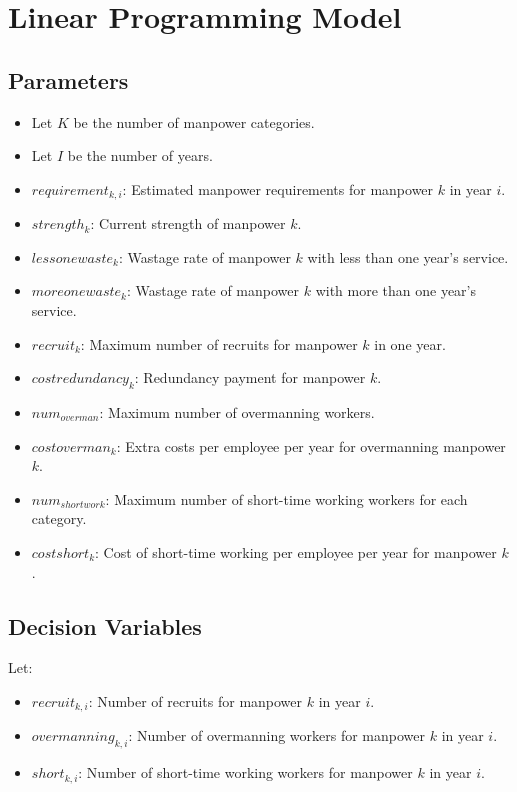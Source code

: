 \documentclass{article}
\begin{document}
\section*{Linear Programming Model}

\subsection*{Parameters}
\begin{itemize}
    \item Let $K$ be the number of manpower categories.
    \item Let $I$ be the number of years.
    \item $requirement_{k, i}$: Estimated manpower requirements for manpower $k$ in year $i$.
    \item $strength_k$: Current strength of manpower $k$.
    \item $lessonewaste_k$: Wastage rate of manpower $k$ with less than one year's service.
    \item $moreonewaste_k$: Wastage rate of manpower $k$ with more than one year's service.
    \item $recruit_k$: Maximum number of recruits for manpower $k$ in one year.
    \item $costredundancy_k$: Redundancy payment for manpower $k$.
    \item $num_{overman}$: Maximum number of overmanning workers.
    \item $costoverman_k$: Extra costs per employee per year for overmanning manpower $k$.
    \item $num_{shortwork}$: Maximum number of short-time working workers for each category.
    \item $costshort_k$: Cost of short-time working per employee per year for manpower $k$.
\end{itemize}

\subsection*{Decision Variables}
Let:
\begin{itemize}
    \item $recruit_{k, i}$: Number of recruits for manpower $k$ in year $i$.
    \item $overmanning_{k, i}$: Number of overmanning workers for manpower $k$ in year $i$.
    \item $short_{k, i}$: Number of short-time working workers for manpower $k$ in year $i$.
\end{itemize}
\end{document}
